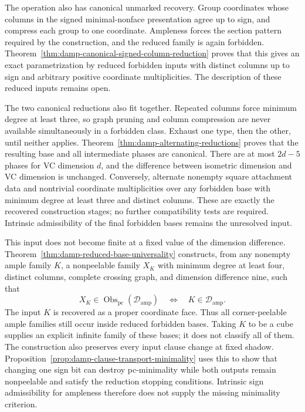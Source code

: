 \documentclass[11pt]{article}
\numberwithin{equation}{section}
\theoremstyle{definition}
\theoremstyle{remark}
\newcommand{\Damp}{\mathcal D_{\mathrm{amp}}}
\newcommand{\Obs}{\operatorname{Obs}_{\mathrm{pc}}}
\begin{document}
The operation also has canonical unmarked recovery.  Group coordinates
whose columns in the signed minimal-nonface presentation agree up to sign,
and compress each group to one coordinate.  Ampleness forces the section
pattern required by the construction, and the reduced family is again
forbidden.  Theorem~\ref{thm:damp-canonical-signed-column-reduction}
proves that this gives an exact parametrization by reduced forbidden inputs
with distinct columns up to sign and arbitrary positive coordinate
multiplicities.  The description of these reduced inputs remains open.

The two canonical reductions also fit together.  Repeated columns force
minimum degree at least three, so graph pruning and column compression
are never available simultaneously in a forbidden class.  Exhaust one
type, then the other, until neither applies.
Theorem~\ref{thm:damp-alternating-reductions} proves that the resulting
base and all intermediate phases are canonical.  There are at most
\(2d-5\) phases for VC dimension \(d\), and the difference between
isometric dimension and VC dimension is unchanged.  Conversely, alternate
nonempty square attachment data and nontrivial coordinate multiplicities
over any forbidden base with minimum degree at least three and distinct
columns.  These are exactly the recovered construction stages; no further
compatibility tests are required.  Intrinsic admissibility of the final
forbidden bases remains the unresolved input.

This input does not become finite at a fixed value of the dimension
difference.  Theorem~\ref{thm:damp-reduced-base-universality} constructs,
from any nonempty ample family \(K\), a nonpeelable family \(X_K\)
with minimum degree at least four, distinct columns, complete crossing
graph, and dimension difference nine, such that
\[
 X_K\in\Obs(\Damp)\quad\Longleftrightarrow\quad K\in\Damp.
\]
The input \(K\) is recovered as a proper coordinate face.  Thus all
corner-peelable ample families still occur inside reduced forbidden
bases.  Taking \(K\) to be a cube supplies an explicit infinite family
of these bases; it does not classify all of them.
The construction also preserves every input clause change at fixed
shadow.  Proposition~\ref{prop:damp-clause-transport-minimality} uses
this to show that changing one sign bit can destroy pc-minimality while
both outputs remain nonpeelable and satisfy the reduction stopping
conditions.  Intrinsic sign admissibility for ampleness therefore does
not supply the missing minimality criterion.
\end{document}
